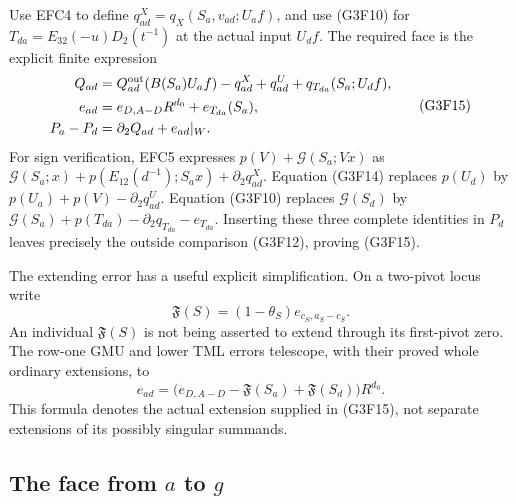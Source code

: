 Use EFC4 to define $q^X_{ad}=q_X(S_a,v_{ad};U_af)$, and use
(G3F10) for $T_{da}=E_{32}(-u)D_2(t^{-1})$ at the actual input
$U_df$.  The required face is the explicit finite expression
\[
 \begin{split}
 Q_{ad}&=Q^{\rm out}_{ad}(B(S_a)U_af)-q^X_{ad}
                         +q^U_{ad}+q_{T_{da}}(S_a;U_df),\\
 e_{ad}&=e_{D,A-D}R^{d_0}+e_{T_{da}}(S_a),\\
                         P_a-P_d&=\partial_2Q_{ad}+e_{ad}|_W.
 \end{split}
 \tag{G3F15}
\]
For sign verification, EFC5 expresses
$p(V)+\mathcal G(S_a;Vx)$ as
$\mathcal G(S_a;x)+p(E_{12}(d^{-1});S_ax)+\partial_2q^X_{ad}$.
Equation (G3F14) replaces $p(U_d)$ by $p(U_a)+p(V)-\partial_2q^U_{ad}$.
Equation (G3F10) replaces $\mathcal G(S_d)$ by
$\mathcal G(S_a)+p(T_{da})-\partial_2q_{T_{da}}-e_{T_{da}}$.
Inserting these three complete identities in $P_d$ leaves
precisely the outside comparison (G3F12), proving (G3F15).

The extending error has a useful explicit simplification.  On a
two-pivot locus write
\[
 \mathfrak F(S)=(1-\theta_S)e_{c_S,a_S-c_S}.
 \tag{G3F16}
\]
An individual $\mathfrak F(S)$ is not being asserted to extend
through its first-pivot zero.  The row-one GMU and lower TML
errors telescope, with their proved whole ordinary extensions, to
\[
 e_{ad}=\bigl(e_{D,A-D}-\mathfrak F(S_a)
                              +\mathfrak F(S_d)\bigr)R^{d_0}.
 \tag{G3F17}
\]
This formula denotes the actual extension supplied in (G3F15),
not separate extensions of its possibly singular summands.

\subsection{The face from $a$ to $g$}

